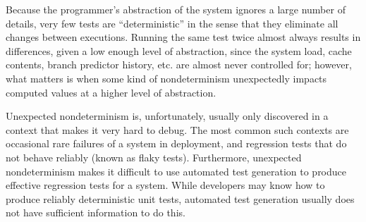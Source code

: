 Because the
programmer's abstraction of the system ignores a large number of
details, very few tests are ``deterministic'' in the sense
that they eliminate all changes between executions.  Running the same test
twice almost always results in differences, given a low enough level of
abstraction, since the system load,
cache contents, branch predictor history, etc. are almost never
controlled for; however, what matters is when
some kind of nondeterminism unexpectedly impacts computed values at a
higher level of abstraction.

\begin{comment} in general, if the operating system
itself is not buggy, low-level nondeterminism, by design, is invisible
except in fine-grained performance testing or real-time systems.
Unexpected nondeterminism usually arises when there is an element of higher-level
state or input that \emph{is} critical to the produced behavior, but
the programmer has not anticipated.  E.g.,  when it is believed that the
behavior of a thread scheduler will not matter, but a race condition
in the code means that it does matter, or when the order of items in
an iterator on a hash table is important, and the hash values used are
randomly salted.
\end{comment}


Unexpected nondeterminism is, unfortunately, usually only discovered
in a context that makes it very hard to debug.   The most common such
contexts are occasional rare failures of a system in deployment, and
regression tests that do not behave reliably (known as flaky tests).
Furthermore, unexpected nondeterminism makes it difficult to use
automated test generation to produce effective regression tests for a
system.  While developers may know how to produce reliably
deterministic unit tests, automated test generation usually does not
have sufficient information to do this.


